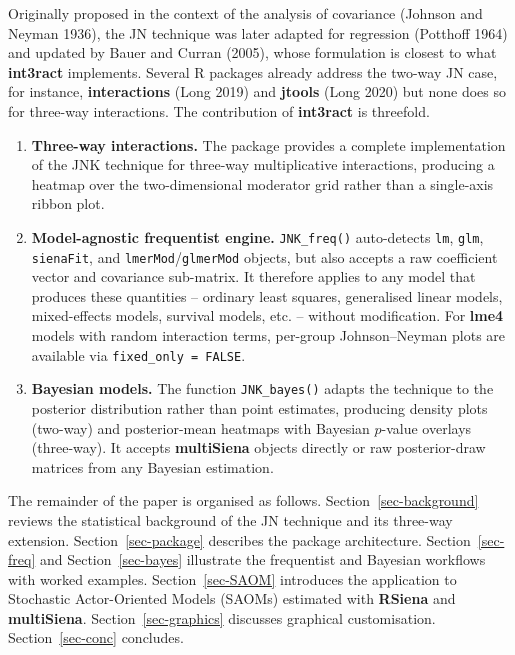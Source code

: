 \documentclass[
  letterpaper,
  DIV=11,
  numbers=noendperiod]{scrartcl}
\begin{document}
Originally proposed in the context of the analysis of covariance
(Johnson and Neyman 1936), the JN technique was later adapted for
regression (Potthoff 1964) and updated by Bauer and Curran (2005), whose
formulation is closest to what \textbf{int3ract} implements. Several R
packages already address the two-way JN case, for instance,
\textbf{interactions} (Long 2019) and \textbf{jtools} (Long 2020) but
none does so for three-way interactions. The contribution of
\textbf{int3ract} is threefold.

\begin{enumerate}
\def\labelenumi{\arabic{enumi}.}
\item
  \textbf{Three-way interactions.} The package provides a complete
  implementation of the JNK technique for three-way multiplicative
  interactions, producing a heatmap over the two-dimensional moderator
  grid rather than a single-axis ribbon plot.
\item
  \textbf{Model-agnostic frequentist engine.} \texttt{JNK\_freq()}
  auto-detects \texttt{lm}, \texttt{glm}, \texttt{sienaFit}, and
  \texttt{lmerMod}/\texttt{glmerMod} objects, but also accepts a raw
  coefficient vector and covariance sub-matrix. It therefore applies to
  any model that produces these quantities -- ordinary least squares,
  generalised linear models, mixed-effects models, survival models, etc.
  -- without modification. For \textbf{lme4} models with random
  interaction terms, per-group Johnson--Neyman plots are available via
  \texttt{fixed\_only\ =\ FALSE}.
\item
  \textbf{Bayesian models.} The function \texttt{JNK\_bayes()} adapts
  the technique to the posterior distribution rather than point
  estimates, producing density plots (two-way) and posterior-mean
  heatmaps with Bayesian \(p\)-value overlays (three-way). It accepts
  \textbf{multiSiena} objects directly or raw posterior-draw matrices
  from any Bayesian estimation.
\end{enumerate}

The remainder of the paper is organised as follows.
Section~\ref{sec-background} reviews the statistical background of the
JN technique and its three-way extension. Section~\ref{sec-package}
describes the package architecture. Section~\ref{sec-freq} and
Section~\ref{sec-bayes} illustrate the frequentist and Bayesian
workflows with worked examples. Section~\ref{sec-SAOM} introduces the
application to Stochastic Actor-Oriented Models (SAOMs) estimated with
\textbf{RSiena} and \textbf{multiSiena}. Section~\ref{sec-graphics}
discusses graphical customisation. Section~\ref{sec-conc} concludes.
\end{document}
